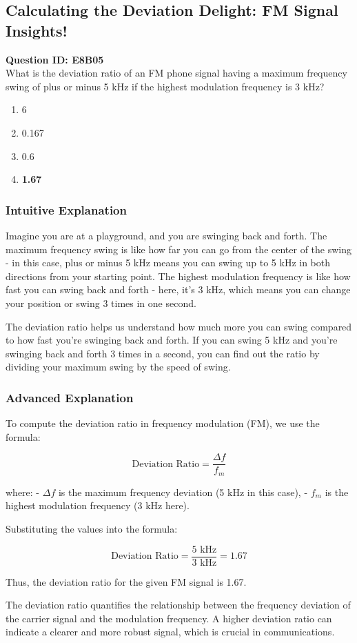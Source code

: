 \subsection{Calculating the Deviation Delight: FM Signal Insights!}

\begin{tcolorbox}
\textbf{Question ID: E8B05} \\
What is the deviation ratio of an FM phone signal having a maximum frequency swing of plus or minus 5 kHz if the highest modulation frequency is 3 kHz? \\

\begin{enumerate}[label=\Alph*.]
    \item 6
    \item 0.167
    \item 0.6
    \item \textbf{1.67}
\end{enumerate}
\end{tcolorbox}

\subsubsection{Intuitive Explanation}
Imagine you are at a playground, and you are swinging back and forth. The maximum frequency swing is like how far you can go from the center of the swing - in this case, plus or minus 5 kHz means you can swing up to 5 kHz in both directions from your starting point. The highest modulation frequency is like how fast you can swing back and forth - here, it’s 3 kHz, which means you can change your position or swing 3 times in one second.

The deviation ratio helps us understand how much more you can swing compared to how fast you're swinging back and forth. If you can swing 5 kHz and you're swinging back and forth 3 times in a second, you can find out the ratio by dividing your maximum swing by the speed of swing.

\subsubsection{Advanced Explanation}
To compute the deviation ratio in frequency modulation (FM), we use the formula:

\[
\text{Deviation Ratio} = \frac{\Delta f}{f_m}
\]

where:
- \(\Delta f\) is the maximum frequency deviation (5 kHz in this case),
- \(f_m\) is the highest modulation frequency (3 kHz here).

Substituting the values into the formula:

\[
\text{Deviation Ratio} = \frac{5 \text{ kHz}}{3 \text{ kHz}} = 1.67
\]

Thus, the deviation ratio for the given FM signal is 1.67.

The deviation ratio quantifies the relationship between the frequency deviation of the carrier signal and the modulation frequency. A higher deviation ratio can indicate a clearer and more robust signal, which is crucial in communications.

